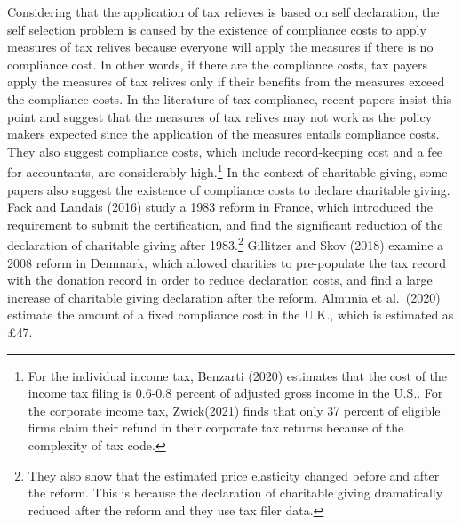 \documentclass[
  11pt,
  a4paper,
]{article}
\begin{document}
Considering that the application of tax relieves is based on self declaration,
the self selection problem is caused by
the existence of compliance costs to apply measures of tax relives
because everyone will apply the measures if there is no compliance cost.
In other words, if there are the compliance costs,
tax payers apply the measures of tax relives only if
their benefits from the measures exceed the compliance costs.
In the literature of tax compliance,
recent papers insist this point and suggest that
the measures of tax relives may not work as
the policy makers expected
since the application of the measures entails compliance costs.
They also suggest compliance costs,
which include record-keeping cost and a fee for accountants,
are considerably high.\footnote{For the individual income tax,
  Benzarti (2020) estimates that the cost of the income tax filing is
  0.6-0.8 percent of adjusted gross income in the U.S..
  For the corporate income tax,
  Zwick(2021) finds that only 37 percent of eligible firms claim
  their refund in their corporate tax returns because of the complexity of tax code.}
In the context of charitable giving,
some papers also suggest the existence of compliance costs to declare charitable giving.
Fack and Landais (2016) study a 1983 reform in France,
which introduced the requirement to submit the certification,
and find the significant reduction of
the declaration of charitable giving after 1983.\footnote{They also show that
  the estimated price elasticity changed before and after the reform.
  This is because the declaration of charitable giving dramatically
  reduced after the reform and they use tax filer data.}
Gillitzer and Skov (2018) examine a 2008 reform in Demmark,
which allowed charities to pre-populate the tax record with the donation record
in order to reduce declaration costs,
and find a large increase of charitable giving declaration after the reform.
Almunia et al.~(2020)
estimate the amount of a fixed compliance cost in the U.K.,
which is estimated as £47.
\end{document}
